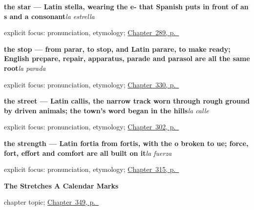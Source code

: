 \noindent\begin{minipage}[t]{\linewidth}
\raggedright
\textbf{the star — Latin stella, wearing the e- that Spanish puts in front of an s and a consonant}\enspace\emph{la estrella}\par
\footnotesize explicit focus: pronunciation, etymology; \hyperref[ch:lo-de-arriba]{Chapter~289, p.~\pageref*{ch:lo-de-arriba}}
\end{minipage}\par\smallskip

\noindent\begin{minipage}[t]{\linewidth}
\raggedright
\textbf{the stop — from parar, to stop, and Latin parare, to make ready; English prepare, repair, apparatus, parade and parasol are all the same root}\enspace\emph{la parada}\par
\footnotesize explicit focus: pronunciation, etymology; \hyperref[ch:camino-y-vez]{Chapter~330, p.~\pageref*{ch:camino-y-vez}}
\end{minipage}\par\smallskip

\noindent\begin{minipage}[t]{\linewidth}
\raggedright
\textbf{the street — Latin callis, the narrow track worn through rough ground by driven animals; the town's word began in the hills}\enspace\emph{la calle}\par
\footnotesize explicit focus: pronunciation, etymology; \hyperref[ch:calle-y-faro]{Chapter~302, p.~\pageref*{ch:calle-y-faro}}
\end{minipage}\par\smallskip

\noindent\begin{minipage}[t]{\linewidth}
\raggedright
\textbf{the strength — Latin fortia from fortis, with the o broken to ue; force, fort, effort and comfort are all built on it}\enspace\emph{la fuerza}\par
\footnotesize explicit focus: pronunciation, etymology; \hyperref[ch:fuerza-y-risa]{Chapter~315, p.~\pageref*{ch:fuerza-y-risa}}
\end{minipage}\par\smallskip

\noindent\begin{minipage}[t]{\linewidth}
\raggedright
\textbf{The Stretches A Calendar Marks}\par
\footnotesize chapter topic; \hyperref[ch:la-jornada-y-la-decada]{Chapter~349, p.~\pageref*{ch:la-jornada-y-la-decada}}
\end{minipage}\par\smallskip

